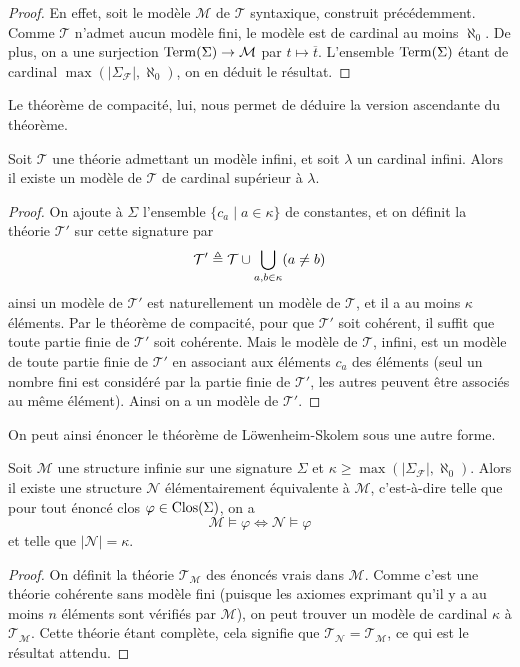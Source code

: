 \begin{proof}
  En effet, soit le modèle $\mathcal M$ de $\mathcal T$ syntaxique, construit
  précédemment. Comme $\mathcal T$ n'admet aucun modèle fini, le modèle est de
  cardinal au moins $\aleph_0$. De plus, on a une surjection
  $\operatorname{Term}(\Sigma) \to \mathcal M$ par $t\mapsto \overline t$. L'ensemble
  $\operatorname{Term}(\Sigma)$ étant de cardinal $\max(|\Sigma_{\mathcal F}|,\aleph_0)$, on
  en déduit le résultat.
\end{proof}

Le théorème de compacité, lui, nous permet de déduire la version ascendante du
théorème.

\begin{theorem}
  Soit $\mathcal T$ une théorie admettant un modèle infini, et
  soit $\lambda$ un cardinal infini. Alors il existe un modèle
  de $\mathcal T$ de cardinal supérieur à $\lambda$.
\end{theorem}

\begin{proof}
  On ajoute à $\Sigma$ l'ensemble $\{c_a\mid a \in \kappa\}$ de constantes, et
  on définit la théorie $\mathcal T'$ sur cette signature par
  \[\mathcal T'\triangleq\mathcal T\cup \bigcup_{a,b\in \kappa}(a\neq b)\]
  ainsi un modèle de $\mathcal T'$ est naturellement un modèle de $\mathcal T$,
  et il a au moins $\kappa$ éléments. Par le théorème de compacité, pour
  que $\mathcal T'$ soit cohérent, il suffit que toute partie finie de
  $\mathcal T'$ soit cohérente. Mais le modèle de $\mathcal T$, infini, est
  un modèle de toute partie finie de $\mathcal T'$ en associant aux éléments
  $c_a$ des éléments (seul un nombre fini est considéré par la partie finie de
  $\mathcal T'$, les autres peuvent être associés au même élément). Ainsi on
  a un modèle de $\mathcal T'$.
\end{proof}

On peut ainsi énoncer le théorème de Löwenheim-Skolem sous une autre forme.

\begin{theorem}
  Soit $\mathcal M$ une structure infinie sur une signature $\Sigma$ et
  $\kappa \geq \max(|\Sigma_{\mathcal F}|,\aleph_0)$. Alors il existe une
  structure $\mathcal N$ élémentairement équivalente à $\mathcal M$,
  c'est-à-dire telle que pour tout énoncé clos $\varphi\in\operatorname{Clos}(\Sigma)$, on a
  \[\mathcal M \models \varphi \iff \mathcal N \models \varphi\]
  et telle que $|\mathcal N| = \kappa$.
\end{theorem}

\begin{proof}
  On définit la théorie $\mathcal T_{\mathcal M}$ des énoncés vrais dans
  $\mathcal M$. Comme c'est une théorie cohérente sans modèle fini (puisque
  les axiomes exprimant qu'il y a au moins $n$ éléments sont vérifiés par
  $\mathcal M$), on peut trouver un modèle de cardinal $\kappa$ à
  $\mathcal T_{\mathcal M}$. Cette théorie étant complète, cela signifie que
  $\mathcal T_{\mathcal N} = \mathcal T_{\mathcal M}$, ce qui est le
  résultat attendu.
\end{proof}
